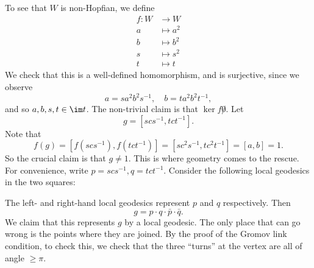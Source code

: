 \documentclass[a4paper]{article}
\begin{document}
\begin{eg}
  To see that $W$ is non-Hopfian, we define
  \begin{align*}
    f: W &\to W\\
    a &\mapsto a^2\\
    b &\mapsto b^2\\
    s &\mapsto s^2\\
    t &\mapsto t
  \end{align*}
  We check that this is a well-defined homomorphism, and is surjective, since we observe
  \[
    a = s a^2 b^2 s^{-1},\quad b = ta^2 b^2 t^{-1},
  \]
  and so $a, b, s, t \in \im t$. The non-trivial claim is that $\ker f \not 0$. Let
  \[
    g = [scs^{-1}, tct^{-1}].
  \]
  Note that
  \[
    f(g) = [f(scs^{-1}), f(tct^{-1})] = [sc^2 s^{-1}, tc^2 t^{-1}] = [a, b] = 1.
  \]
  So the crucial claim is that $g \not= 1$. This is where geometry comes to the rescue. For convenience, write $p = scs^{-1}, q = tct^{-1}$. Consider the following local geodesics in the two squares:
  \begin{center}
  \end{center}
  The left- and right-hand local geodesics represent $p$ and $q$ respectively. Then
  \[
    g = p \cdot q \cdot \bar{p} \cdot \bar{q}.
  \]
  We claim that this represents $g$ by a local geodesic. The only place that can go wrong is the points where they are joined. By the proof of the Gromov link condition, to check this, we check that the three ``turns'' at the vertex are all of angle $\geq \pi$.
  \begin{center}
\end{center}
\end{eg}
\end{document}
